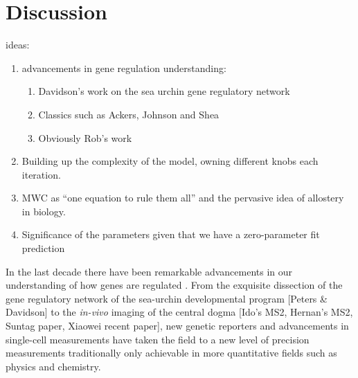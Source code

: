 \pagebreak
\section*{Discussion }



ideas:
\begin{enumerate}
  \item advancements in gene regulation understanding:
    \begin{enumerate}
      \item Davidson's work on the sea urchin gene regulatory network
      \item Classics such as Ackers, Johnson and Shea
      \item Obviously Rob's work
    \end{enumerate}
  \item Building up the complexity of the model, owning different knobs each
  iteration.
  \item MWC as ``one equation to rule them all'' and the pervasive idea of
  allostery in biology.
  \item Significance of the parameters given that we have a zero-parameter fit
  prediction
\end{enumerate}

In the last decade there have been remarkable advancements in our  understanding
of how genes are regulated . From the exquisite dissection of the gene regulatory
network of the sea-urchin developmental program [Peters & Davidson] to the
\textit{in-vivo}  imaging of the central dogma [Ido's MS2, Hernan's MS2, Suntag
paper, Xiaowei recent paper], new genetic reporters and  advancements in
single-cell measurements have taken the field to a new level of precision
measurements traditionally only achievable in more quantitative fields such as
physics and chemistry.

